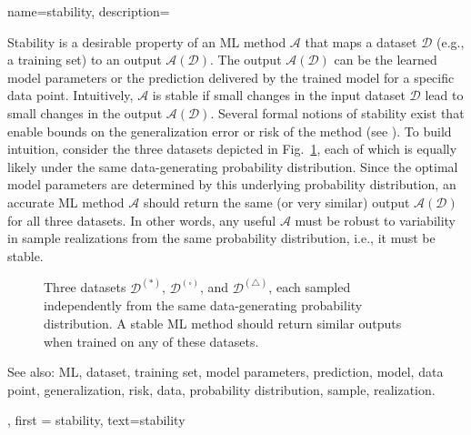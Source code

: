 {name={stability},
	description={
		Stability is a desirable property of an ML method $\mathcal{A}$ that maps a 
		dataset $\mathcal{D}$ (e.g., a training set) to an output $\mathcal{A}(\mathcal{D})$. The output 
		$\mathcal{A}(\mathcal{D})$ can be the learned model parameters or the prediction delivered 
		by the trained model for a specific data point. Intuitively, $\mathcal{A}$ is 
		stable if small changes in the input dataset $\mathcal{D}$ lead to small changes in the 
		output $\mathcal{A}(\mathcal{D})$. Several formal notions of stability exist that enable bounds 
		on the generalization error or risk of the method (see \cite[Ch.~13]{ShalevMLBook}).
		To build intuition, consider the three datasets depicted in Fig.~\ref{fig_three_data_stability}, each 
		of which is equally likely under the same data-generating probability distribution. Since the 
		optimal model parameters are determined by this underlying probability distribution, an accurate 
		ML method $\mathcal{A}$ should return the same (or very similar) output $\mathcal{A}(\mathcal{D})$ 
		for all three datasets. In other words, any useful $\mathcal{A}$ must be robust to 
		variability in sample realizations from the same probability distribution, i.e., it must be stable. 
		\begin{figure}[H]
			\centering
			\caption{Three datasets $\mathcal{D}^{(*)}$, $\mathcal{D}^{(\square)}$, and $\mathcal{D}^{(\triangle)}$, 
				each sampled independently from the same data-generating probability distribution. A stable ML 
				method should return similar outputs when trained on any of these datasets. \label{fig_three_data_stability}}
		\end{figure}
		See also: ML, dataset, training set, model parameters, prediction, model, data point, generalization, risk, data, probability distribution, sample, realization.
		}, 
	first = {stability}, text={stability} 
}

